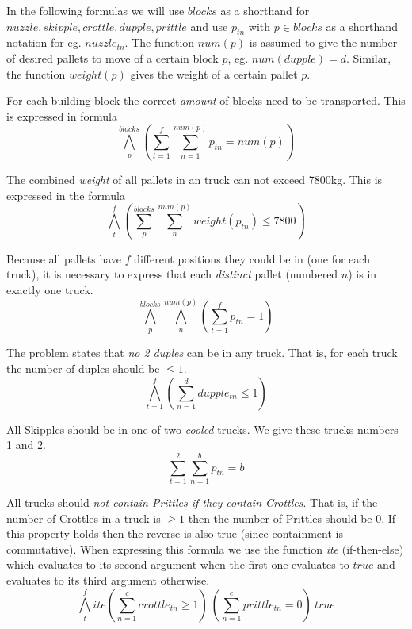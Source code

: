 \documentclass[12pt]{article}
\begin{document}
\vspace{3mm}

In the following formulas we will use $blocks$ as a shorthand for ${nuzzle, 
skipple, crottle, dupple, prittle}$ and use $p_{tn}$ with $p \in blocks$
as a shorthand notation for eg. $nuzzle_{tn}$. The function $num(p)$ is assumed 
to give the number of desired pallets to move of a certain block $p$, eg.
$num(dupple) = d$. Similar, the function $weight(p)$ gives the weight of a 
certain pallet $p$.

\vspace{3mm}

For each building block the correct \emph{amount} of blocks need to be
transported. This is expressed in formula
\begin{equation} \label{eq:amount}
  \bigwedge_p^{blocks} (\sum_{t=1}^{f} \sum_{n=1}^{num(p)} p_{tn} = num(p))
\end{equation}

The combined \emph{weight} of all pallets in an truck can not exceed 7800kg. 
This is expressed in the formula
\begin{equation} \label{eq:weight}
 \bigwedge_t^f (\sum_p^{blocks} \sum_n^{num(p)} weight(p_{tn}) \leq 7800)
\end{equation}

Because all pallets have $f$ different positions they could be in (one for each
truck), it is necessary to express that each \emph{distinct} pallet (numbered 
$n$) is in exactly one truck.
\begin{equation} \label{eq:distinct}
  \bigwedge_p^{blocks} \bigwedge_n^{num(p)} (\sum_{t=1}^f p_{tn} = 1)
\end{equation}

The problem states that \emph{no 2 duples} can be in any truck. 
That is, for each truck the number of duples should be $\leq 1$. 
\begin{equation} \label{eq:valuable}
  \bigwedge_{t=1}^f (\sum_{n=1}^d dupple_{tn} \leq 1)
\end{equation}

All Skipples should be in one of two \emph{cooled} trucks. We give these trucks
numbers 1 and 2. 
\begin{equation} \label{eq:cooled}
  \sum_{t=1}^2 \sum_{n=1}^b p_{tn} = b
\end{equation}

All trucks should \emph{not contain Prittles if they contain Crottles}. That is,
if the number of Crottles in a truck is $\geq 1$ then the number of Prittles 
should be 0. If this
property holds then the reverse is also true (since containment is commutative).
When expressing this formula we use the function \emph{ite} (if-then-else) which
evaluates to its second argument when the first one evaluates to $true$ and 
evaluates to its third argument otherwise.
\begin{equation} \label{eq:explosive}
  \bigwedge_t^f ite 	(\sum_{n=1}^c crottle_{tn} \geq 1)\  
						(\sum_{n=1}^e prittle_{tn} = 0)\ 
						true 
\end{equation}
\end{document}
